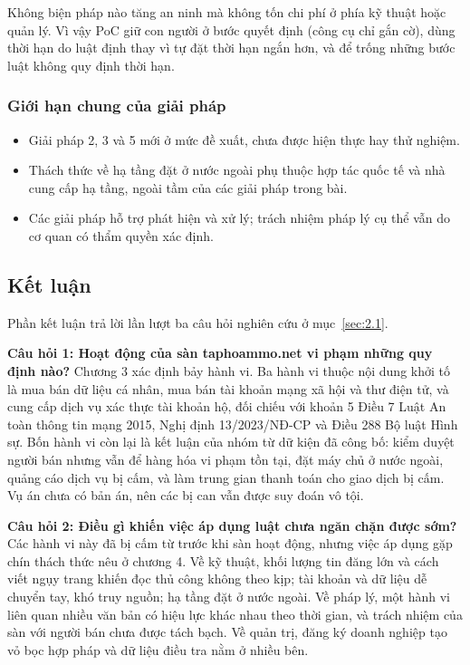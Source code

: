 Không biện pháp nào tăng an ninh mà không tốn chi phí ở phía kỹ thuật hoặc quản lý. Vì vậy PoC giữ con người ở bước quyết định (công cụ chỉ gắn cờ), dùng thời hạn do luật định thay vì tự đặt thời hạn ngắn hơn, và để trống những bước luật không quy định thời hạn.

\subsubsection{Giới hạn chung của giải pháp}\label{sec:6.1.3}

\begin{itemize}
\item Giải pháp 2, 3 và 5 mới ở mức đề xuất, chưa được hiện thực hay thử nghiệm.
\item Thách thức về hạ tầng đặt ở nước ngoài phụ thuộc hợp tác quốc tế và nhà cung cấp hạ tầng, ngoài tầm của các giải pháp trong bài.
\item Các giải pháp hỗ trợ phát hiện và xử lý; trách nhiệm pháp lý cụ thể vẫn do cơ quan có thẩm quyền xác định.
\end{itemize}
\subsection{Kết luận}\label{sec:6.2}

Phần kết luận trả lời lần lượt ba câu hỏi nghiên cứu ở mục~\ref{sec:2.1}.

\textbf{Câu hỏi 1: Hoạt động của sàn taphoammo.net vi phạm những quy định nào?} Chương 3 xác định bảy hành vi. Ba hành vi thuộc nội dung khởi tố là mua bán dữ liệu cá nhân, mua bán tài khoản mạng xã hội và thư điện tử, và cung cấp dịch vụ xác thực tài khoản hộ, đối chiếu với khoản 5 Điều 7 Luật An toàn thông tin mạng 2015, Nghị định 13/2023/NĐ-CP và Điều 288 Bộ luật Hình sự. Bốn hành vi còn lại là kết luận của nhóm từ dữ kiện đã công bố: kiểm duyệt người bán nhưng vẫn để hàng hóa vi phạm tồn tại, đặt máy chủ ở nước ngoài, quảng cáo dịch vụ bị cấm, và làm trung gian thanh toán cho giao dịch bị cấm. Vụ án chưa có bản án, nên các bị can vẫn được suy đoán vô tội.

\textbf{Câu hỏi 2: Điều gì khiến việc áp dụng luật chưa ngăn chặn được sớm?} Các hành vi này đã bị cấm từ trước khi sàn hoạt động, nhưng việc áp dụng gặp chín thách thức nêu ở chương 4. Về kỹ thuật, khối lượng tin đăng lớn và cách viết ngụy trang khiến đọc thủ công không theo kịp; tài khoản và dữ liệu dễ chuyển tay, khó truy nguồn; hạ tầng đặt ở nước ngoài. Về pháp lý, một hành vi liên quan nhiều văn bản có hiệu lực khác nhau theo thời gian, và trách nhiệm của sàn với người bán chưa được tách bạch. Về quản trị, đăng ký doanh nghiệp tạo vỏ bọc hợp pháp và dữ liệu điều tra nằm ở nhiều bên.

